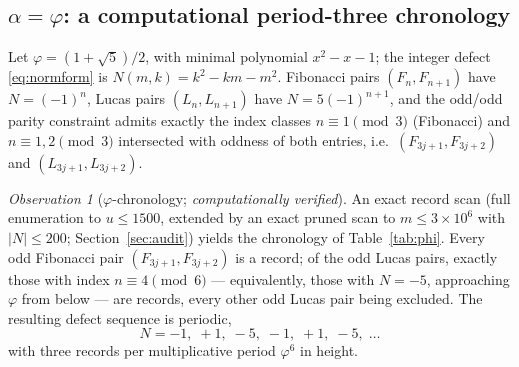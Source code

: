 \documentclass[11pt]{article}
\theoremstyle{definition}
\theoremstyle{remark}
\newtheorem{observation}[theorem]{Observation}
\begin{document}
\subsection{$\alpha=\varphi$: a computational period-three chronology}\label{sec:phi}

Let $\varphi=(1+\sqrt5)/2$, with minimal polynomial $x^2-x-1$; the integer defect \eqref{eq:normform} is $N(m,k)=k^2-km-m^2$. Fibonacci pairs $(F_n,F_{n+1})$ have $N=(-1)^n$, Lucas pairs $(L_n,L_{n+1})$ have $N=5(-1)^{n+1}$, and the odd/odd parity constraint admits exactly the index classes $n\equiv1\pmod3$ (Fibonacci) and $n\equiv1,2\pmod3$ intersected with oddness of both entries, i.e.\ $(F_{3j+1},F_{3j+2})$ and $(L_{3j+1},L_{3j+2})$.

\begin{observation}[$\varphi$-chronology; \emph{computationally verified}]\label{obs:phi}
An exact record scan (full enumeration to $u\le1500$, extended by an exact pruned scan to $m\le3\times10^6$ with $|N|\le200$; Section~\ref{sec:audit}) yields the chronology of Table~\ref{tab:phi}. Every odd Fibonacci pair $(F_{3j+1},F_{3j+2})$ is a record; of the odd Lucas pairs, exactly those with index $n\equiv4\pmod 6$ --- equivalently, those with $N=-5$, approaching $\varphi$ from below --- are records, every other odd Lucas pair being excluded. The resulting defect sequence is periodic,
\[
N=-1,\;+1,\;-5,\;-1,\;+1,\;-5,\;\dots
\]
with three records per multiplicative period $\varphi^6$ in height.
\end{observation}
\end{document}
